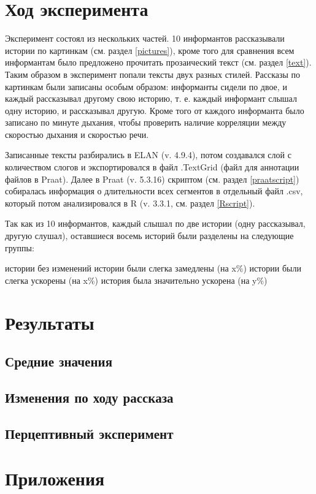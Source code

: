 \section{Ход эксперимента}
Эксперимент состоял из нескольких частей. 10 информантов рассказывали истории по картинкам (см. раздел \ref{pictures}), кроме того для сравнения всем информантам было предложено прочитать прозаический текст (см. раздел \ref{text}). Таким образом в эксперимент попали тексты двух разных стилей. Рассказы по картинкам были записаны особым образом: информанты сидели по двое, и каждый рассказывал другому свою историю, т. е. каждый информант слышал одну историю, и рассказывал другую. Кроме того от каждого информанта было записано по минуте дыхания, чтобы проверить наличие корреляции между скоростью дыхания и скоростью речи.
\par Записанные тексты разбирались в ELAN (v. 4.9.4), потом создавался слой с количеством слогов и экспортировался в файл .TextGrid (файл для аннотации файлов в Praat). Далее в Praat (v. 5.3.16) скриптом (см. раздел \ref{praatscript}) собиралась информация о длительности всех сегментов в отдельный файл .csv, который потом анализировался в R (v. 3.3.1, см. раздел \ref{Rscript}).
\par Так как из 10 информантов, каждый слышал по две истории (одну рассказывал, другую слушал), оставшиеся восемь историй были разделены на следующие группы:
\begin{itemize}
 истории без изменений
 истории были слегка замедлены (на x\%)
 истории были слегка ускорены (на x\%)
 история была значительно ускорена (на y\%)
\end{itemize}
\section{Результаты}
\subsection{Средние значения}
\subsection{Изменения по ходу рассказа}
\subsection{Перцептивный эксперимент}
\pagebreak
\footnotesize


\normalsize
\section{Приложения}
